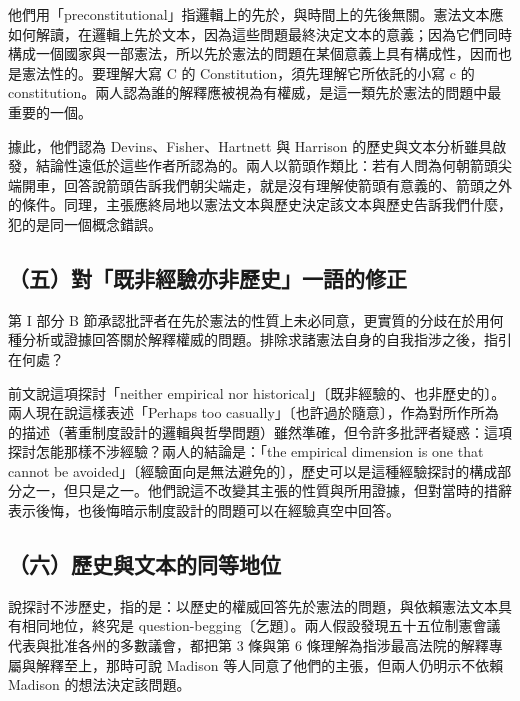 他們用「preconstitutional」指邏輯上的先於，與時間上的先後無關。憲法文本應如何解讀，在邏輯上先於文本，因為這些問題最終決定文本的意義；因為它們同時構成一個國家與一部憲法，所以先於憲法的問題在某個意義上具有構成性，因而也是憲法性的。要理解大寫 C 的 Constitution，須先理解它所依託的小寫 c 的 constitution。兩人認為誰的解釋應被視為有權威，是這一類先於憲法的問題中最重要的一個。

據此，他們認為 Devins、Fisher、Hartnett 與 Harrison 的歷史與文本分析雖具啟發，結論性遠低於這些作者所認為的。兩人以箭頭作類比：若有人問為何朝箭頭尖端開車，回答說箭頭告訴我們朝尖端走，就是沒有理解使箭頭有意義的、箭頭之外的條件。同理，主張應終局地以憲法文本與歷史決定該文本與歷史告訴我們什麼，犯的是同一個概念錯誤。

\subsection{（五）對「既非經驗亦非歷史」一語的修正}

第 I 部分 B 節承認批評者在先於憲法的性質上未必同意，更實質的分歧在於用何種分析或證據回答關於解釋權威的問題。排除求諸憲法自身的自我指涉之後，指引在何處？

前文說這項探討「neither empirical nor historical」〔既非經驗的、也非歷史的〕。兩人現在說這樣表述「Perhaps too casually」〔也許過於隨意〕，作為對所作所為的描述（著重制度設計的邏輯與哲學問題）雖然準確，但令許多批評者疑惑：這項探討怎能那樣不涉經驗？兩人的結論是：「the empirical dimension is one that cannot be avoided」〔經驗面向是無法避免的〕，歷史可以是這種經驗探討的構成部分之一，但只是之一。他們說這不改變其主張的性質與所用證據，但對當時的措辭表示後悔，也後悔暗示制度設計的問題可以在經驗真空中回答。

\subsection{（六）歷史與文本的同等地位}

說探討不涉歷史，指的是：以歷史的權威回答先於憲法的問題，與依賴憲法文本具有相同地位，終究是 question-begging〔乞題〕。兩人假設發現五十五位制憲會議代表與批准各州的多數議會，都把第 3 條與第 6 條理解為指涉最高法院的解釋專屬與解釋至上，那時可說 Madison 等人同意了他們的主張，但兩人仍明示不依賴 Madison 的想法決定該問題。


